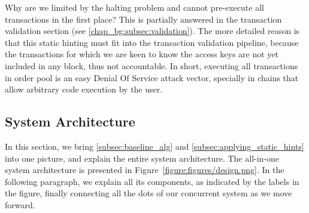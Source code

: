 \begin{remark}
	Why are we limited by the halting problem and cannot pre-execute all transactions in the first
	place? This is partially answered in the transaction validation section (see
	\ref{chap_bg:subsec:validation}). The more detailed reason is that this static hinting must fit
	into the transaction validation pipeline, because the transactions for which we are keen to know
	the access keys are not yet included in any block, thus not accountable. In short, executing all
	transactions in order pool is an easy Denial Of Service attack vector, specially in chains that
	allow arbitrary code execution by the user.
\end{remark}

\subsection{System Architecture}

In this section, we bring \ref{subsec:baseline_alg} and \ref{subsec:applying_static_hints} into one
picture, and explain the entire system architecture. The all-in-one system architecture is presented
in Figure~\ref{figure:figures/design.png}. In the following paragraph, we explain all its
components, as indicated by the labels in the figure, finally connecting all the dots of our
concurrent system as we move forward.




